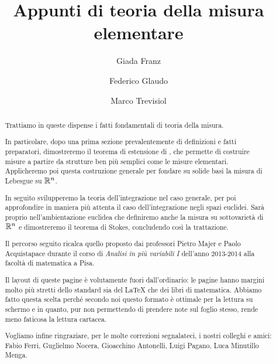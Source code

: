 \documentclass[a4paper,12pt]{article}
\title{Appunti di teoria della misura elementare}
\author{Giada Franz \and Federico Glaudo \and Marco Trevisiol}
\begin{document}
\maketitle

\begin{abstract}
	Trattiamo in queste dispense i fatti fondamentali di teoria della misura.
	
	In particolare, dopo una prima sezione prevalentemente di definizioni e fatti preparatori, dimostreremo il teorema di estensione di \carat{}, che permette di costruire misure a partire da strutture ben più semplici come le misure elementari. Applicheremo poi questa costruzione generale per fondare su solide basi la misura di Lebesgue su $\mathbb R^n$.
	
	In seguito svilupperemo la teoria dell'integrazione nel caso generale, per poi approfondire in maniera più attenta il caso dell'integrazione negli spazi euclidei. Sarà proprio nell'ambientazione euclidea che definiremo anche la misura su sottovarietà di $\mathbb R^n$ e dimostreremo il teorema di Stokes, concludendo così la trattazione.
	
	Il percorso seguito ricalca quello proposto dai professori Pietro Majer e Paolo Acquistapace durante il corso di \textit{Analisi in più variabili I} dell'anno 2013-2014 alla facoltà di matematica a Pisa.
	
	Il layout di queste pagine è volutamente fuori dall'ordinario: le pagine hanno margini molto più stretti dello standard sia del \LaTeX{} che dei libri di matematica. 
	Abbiamo fatto questa scelta perché secondo noi questo formato è ottimale per la lettura su schermo e in quanto, pur non permettendo di prendere note sul foglio stesso, rende meno faticosa la lettura cartacea.
	
	Vogliamo infine ringraziare, per le molte correzioni segnalateci, i nostri colleghi e amici: Fabio Ferri, Guglielmo Nocera, Gioacchino Antonelli, Luigi Pagano, Luca Minutillo Menga.
\end{abstract}
\clearpage

\tableofcontents
\clearpage











\printindex
\end{document}
